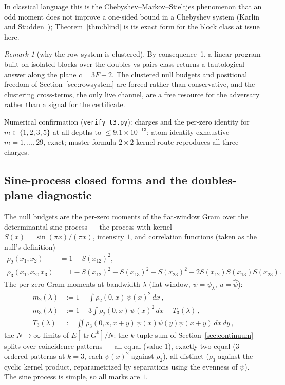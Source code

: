 \documentclass[11pt]{article}
\theoremstyle{plain}
\theoremstyle{definition}
\theoremstyle{remark}
\newtheorem*{remk}{Remark}
\newcommand{\tr}{\operatorname{tr}}
\begin{document}
In classical language this is the Chebyshev--Markov--Stieltjes phenomenon that an
odd moment does not improve a one-sided bound in a Chebyshev system (Karlin and
Studden~\cite{KS66}); Theorem~\ref{thm:blind} is its exact form for the block
class at issue here.

\begin{remk}[why the row system is clustered]
By consequence~1, a linear program built on isolated blocks over the
doubles-vs-pairs class returns a tautological answer along the plane
$c = 3F - 2$. The clustered null budgets and positional freedom of
Section~\ref{sec:rowsystem} are forced rather than conservative, and the
clustering cross-terms, the only live channel, are a free resource for the
adversary rather than a signal for the certificate.
\end{remk}

Numerical confirmation (\texttt{verify\_t3.py}): charges and the per-zero
identity for $m \in \{1, 2, 3, 5\}$ at all depths to $\le 9.1 \times 10^{-13}$;
atom identity exhaustive $m = 1, \ldots, 29$, exact; master-formula
$2 \times 2$ kernel route reproduces all three charges.

\subsection{Sine-process closed forms and the doubles-plane diagnostic}
\label{sec:sine}

The null budgets are the per-zero moments of the flat-window Gram over the
determinantal sine process --- the process with kernel
$S(x) = \sin(\pi x)/(\pi x)$, intensity $1$, and correlation functions (taken as
the null's definition)
\begin{align*}
  \rho_2(x_1, x_2) &= 1 - S(x_{12})^2,\\
  \rho_3(x_1, x_2, x_3) &= 1 - S(x_{12})^2 - S(x_{13})^2 - S(x_{23})^2
    + 2 S(x_{12}) S(x_{13}) S(x_{23}).
\end{align*}
The per-zero Gram moments at bandwidth $\lambda$ (flat window,
$\psi = \psi_\lambda$, $u = \widehat{\psi}$):
\begin{align*}
  m_2(\lambda) &:= 1 + \int \rho_2(0, x)\, \psi(x)^2\, dx \,,\\
  m_3(\lambda) &:= 1 + 3 \int \rho_2(0, x)\, \psi(x)^2\, dx + T_3(\lambda) \,,\\
  T_3(\lambda) &:= \iint \rho_3(0, x, x + y)\, \psi(x) \psi(y) \psi(x + y)\,
    dx\, dy \,,
\end{align*}
the $N \to \infty$ limits of $E[\tr G^k]/N$: the $k$-tuple sum of
Section~\ref{sec:continuum} splits over coincidence patterns --- all-equal (value
$1$), exactly-two-equal ($3$ ordered patterns at $k = 3$, each $\psi(x)^2$
against $\rho_2$), all-distinct ($\rho_3$ against the cyclic kernel product,
reparametrized by separations using the evenness of $\psi$). The sine process is
simple, so all marks are $1$.
\end{document}
